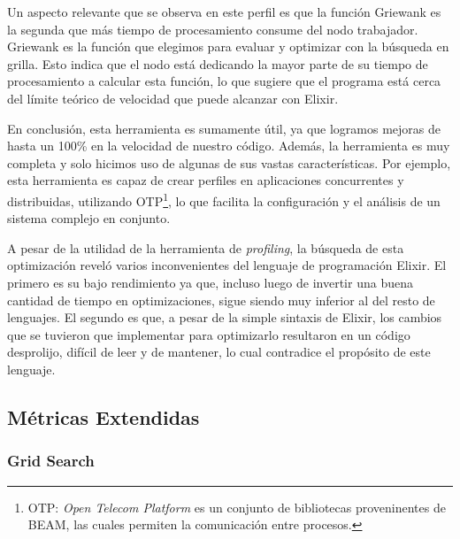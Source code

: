 \documentclass[11pt]{article}
\let\Oldsubsection\subsection
\renewcommand{\subsection}{\FloatBarrier\Oldsubsection}
\let\Oldsubsubsection\subsubsection
\renewcommand{\subsubsection}{\FloatBarrier\Oldsubsubsection}
\newcommand{\english}[1]{\textit{#1}}
\begin{document}
Un aspecto relevante que se observa en este perfil es que la función Griewank es la segunda que más tiempo de procesamiento consume del nodo trabajador. Griewank es la función que elegimos para evaluar y optimizar con la búsqueda en grilla. Esto indica que el nodo está dedicando la mayor parte de su tiempo de procesamiento a calcular esta función, lo que sugiere que el programa está cerca del límite teórico de velocidad que puede alcanzar con Elixir.

En conclusión, esta herramienta es sumamente útil, ya que logramos mejoras de hasta un 100\% en la velocidad de nuestro código. Además, la herramienta es muy completa y solo hicimos uso de algunas de sus vastas características. Por ejemplo, esta herramienta es capaz de crear perfiles en aplicaciones concurrentes y distribuidas, utilizando OTP\footnote{OTP: \english{Open Telecom Platform} es un conjunto de bibliotecas proveninentes de BEAM, las cuales permiten la comunicación entre procesos.}, lo que facilita la configuración y el análisis de un sistema complejo en conjunto.

A pesar de la utilidad de la herramienta de \english{profiling}, la búsqueda de esta optimización reveló varios inconvenientes del lenguaje de programación Elixir. El primero es su bajo rendimiento ya que, incluso luego de invertir una buena cantidad de tiempo en optimizaciones, sigue siendo muy inferior al del resto de lenguajes. El segundo es que, a pesar de la simple sintaxis de Elixir, los cambios que se tuvieron que implementar para optimizarlo resultaron en un código desprolijo, difícil de leer y de mantener, lo cual contradice el propósito de este lenguaje.


\subsection{Métricas Extendidas} \label{sec:anex:metrics} 

\subsubsection{Grid Search} \label{sec:anex:metrics:gs}
\end{document}
